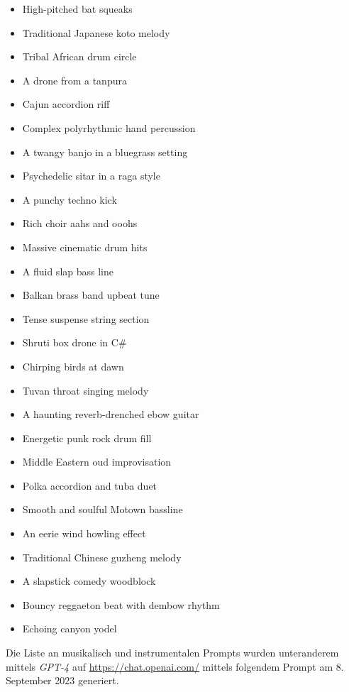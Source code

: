 \documentclass[
  a4paper,  %
  twoside,  %
  bibliography=totoc,
  headsepline,
  cleardoublepage=empty,
  parskip=half,
  draft=false
]{scrbook}
\begin{document}
\begin{multicols}{4}
\begin{itemize}
    \item High-pitched bat squeaks
    \item Traditional Japanese koto melody
    \item Tribal African drum circle
    \item A drone from a tanpura
    \item Cajun accordion riff
    \item Complex polyrhythmic hand percussion
    \item A twangy banjo in a bluegrass setting
    \item Psychedelic sitar in a raga style
    \item A punchy techno kick
    \item Rich choir aahs and ooohs
    \item Massive cinematic drum hits
    \item A fluid slap bass line
    \item Balkan brass band upbeat tune
    \item Tense suspense string section
    \item Shruti box drone in C\#
    \item Chirping birds at dawn
    \item Tuvan throat singing melody
    \item A haunting reverb-drenched ebow guitar
    \item Energetic punk rock drum fill
    \item Middle Eastern oud improvisation
    \item Polka accordion and tuba duet
    \item Smooth and soulful Motown bassline
    \item An eerie wind howling effect
    \item Traditional Chinese guzheng melody
    \item A slapstick comedy woodblock
    \item Bouncy reggaeton beat with dembow rhythm
    \item Echoing canyon yodel
\end{itemize}
\end{multicols}

Die Liste an musikalisch und instrumentalen Prompts wurden unteranderem mittels \emph{GPT-4}\cite{openai_gpt-4_2023} auf \url{https://chat.openai.com/} mittels folgendem Prompt am 8. September 2023 generiert. 

\end{document}

